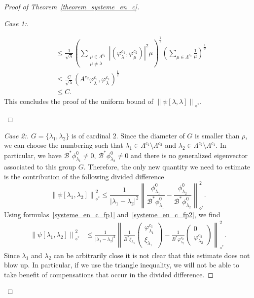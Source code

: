 \documentclass[11pt]{article}
\theoremstyle{definition}
\numberwithin{equation}{section}
\numberwithin{figure}{section}
\numberwithin{table}{section}
\newenvironment{step}[1]{\begin{proof}[#1]}{\let\qed\relax\end{proof}}
\newcommand{\fprop}[2]{\varphi^{#1}_{#2}}
\newcommand\Bs{\mathcal{B}^*}
\newcommand{\normeXalphas}[1]{\left\| #1 \right\|_{\diamond^*}}
\begin{document}
\begin{proof}[Proof of Theorem~\ref{theorem_systeme_en_c}]
\begin{step}{Case 1:}
\begin{itemize}
\begin{align*}
& \leq \frac{1}{\sqrt{\lambda}} \left(\sum_{\substack{\mu\in \Lambda^{c_2}\\ \mu \neq \lambda}} |(\fprop{c_1}{\lambda},\fprop{c_2}{\mu})|^2 \mu \right)^{\frac{1}{2}} \left(\sum_{\mu\in \Lambda^{c_2}} \frac{1}{\mu}\right)^{\frac{1}{2}} \\
& \leq \frac{C}{\sqrt{\lambda}} (A^{c_2}\fprop{c_1}{\lambda},\fprop{c_1}{\lambda})^{\frac{1}{2}} \\
& \leq C.
\end{align*}
This concludes the proof of the uniform bound of $\normeXalphas{\psi[\lambda,\lambda]}$.
\end{itemize}


\end{step}


\begin{step}{Case 2:}
$G=\{\lambda_1,\lambda_2\}$ is of cardinal $2$. Since the diameter of $G$ is smaller than $\rho$, we can choose the numbering such that $\lambda_1\in \Lambda^{c_1}\setminus \Lambda^{c_2}$ and $\lambda_2\in \Lambda^{c_2}\setminus\Lambda^{c_1}$. In particular, we have $\Bs \phi_{\lambda_1}^0\neq 0$, $\Bs\phi_{\lambda_2}^0 \neq 0$ and there is no generalized eigenvector associated to this group $G$. Therefore, the only new quantity we need to estimate is the contribution of the following divided difference
\[
\normeXalphas{\psi[\lambda_1,\lambda_2]}^2 \leq \frac{1}{|\lambda_1-\lambda_2|^2} \normeXalphas{\frac{\phi_{\lambda_1}^0}{\Bs \phi_{\lambda_1}^0} -\frac{\phi_{\lambda_2}^0}{\Bs \phi_{\lambda_2}^0} }^2.
\]
Using formulas~\eqref{systeme_en_c_fp1} and~\eqref{systeme_en_c_fp2}, we find
\begin{align*}
\normeXalphas{\psi[\lambda_1,\lambda_2]}^2 & \leq \frac{1}{|\lambda_1-\lambda_2|^2} \normeXalphas{ \frac{1}{B^* \xi_{\lambda_1}}
\begin{pmatrix} \fprop{c_1}{\lambda_1}\\ \xi_{\lambda_1}
\end{pmatrix} - \frac{1}{B^*\fprop{c_2}{\lambda_2}}
\begin{pmatrix} 0 \\ \fprop{c_2}{\lambda_2}
\end{pmatrix} }^2.
\end{align*}
Since $\lambda_1$ and $\lambda_2$ can be arbitrarily close it is not clear that this estimate does not blow up. In particular, if we use the triangle inequality, we will not be able to take benefit of compensations that occur in the divided difference.


\end{step}
\end{proof}
\end{document}
